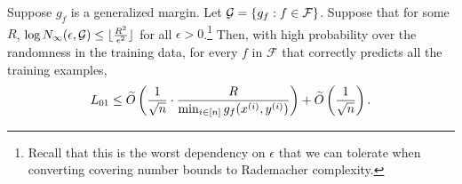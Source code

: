 \begin{lemma}
	Suppose $g_f$ is a generalized margin. Let $\mathcal G = \{g_f: f \in \mathcal{F}\}$. Suppose that for some $R$, $\log N_\infty(\epsilon, \mathcal G) \leq \lfloor \frac{R^2}{\epsilon^2} \rfloor$ for all $\epsilon > 0$.\footnote{Recall that this is the worst dependency on $\epsilon$ that we can tolerate when converting covering number bounds to Rademacher complexity.} Then, with high probability over the randomness in the training data, for every $f$ in $\mathcal{F}$ that correctly predicts all the training examples,
	\begin{equation}
	L_{01} \leq \widetilde{O} \left (\frac{1}{\sqrt{n}} \cdot \frac{R}{\min_{i \in [n]} g_f(x^{(i)}, y^{(i)})} \right ) + \widetilde{O}\left (\frac{1}{\sqrt{n}}\right ).
	\end{equation}
	\label{lec11:genmargin-lemma}
\end{lemma}

